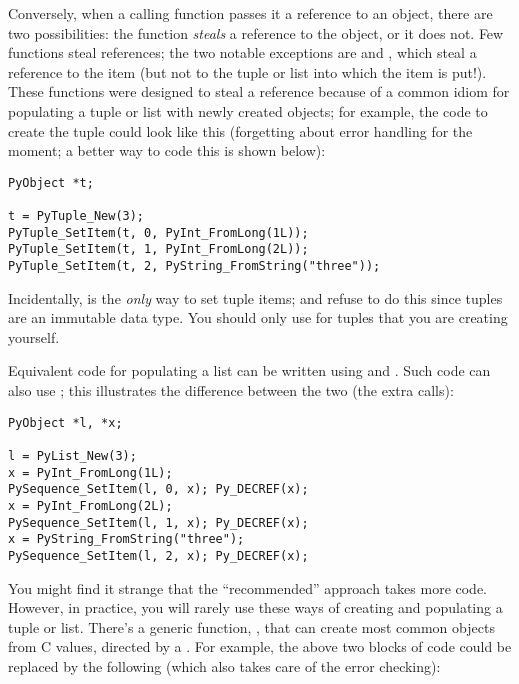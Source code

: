 Conversely, when a calling function passes it a reference to an 
object, there are two possibilities: the function \emph{steals} a 
reference to the object, or it does not.  Few functions steal 
references; the two notable exceptions are
 and
, which 
steal a reference to the item (but not to the tuple or list into which
the item is put!).  These functions were designed to steal a reference
because of a common idiom for populating a tuple or list with newly
created objects; for example, the code to create the tuple  could look like this (forgetting about error handling for
the moment; a better way to code this is shown below):

\begin{verbatim}
PyObject *t;

t = PyTuple_New(3);
PyTuple_SetItem(t, 0, PyInt_FromLong(1L));
PyTuple_SetItem(t, 1, PyInt_FromLong(2L));
PyTuple_SetItem(t, 2, PyString_FromString("three"));
\end{verbatim}

Incidentally,  is the \emph{only} way to
set tuple items;  and
 refuse to do this since tuples are an
immutable data type.  You should only use
 for tuples that you are creating
yourself.

Equivalent code for populating a list can be written using 
 and .  Such code
can also use ; this illustrates the
difference between the two (the extra  calls):

\begin{verbatim}
PyObject *l, *x;

l = PyList_New(3);
x = PyInt_FromLong(1L);
PySequence_SetItem(l, 0, x); Py_DECREF(x);
x = PyInt_FromLong(2L);
PySequence_SetItem(l, 1, x); Py_DECREF(x);
x = PyString_FromString("three");
PySequence_SetItem(l, 2, x); Py_DECREF(x);
\end{verbatim}

You might find it strange that the ``recommended'' approach takes more
code.  However, in practice, you will rarely use these ways of
creating and populating a tuple or list.  There's a generic function,
, that can create most common objects from
C values, directed by a .  For example, the
above two blocks of code could be replaced by the following (which
also takes care of the error checking):

